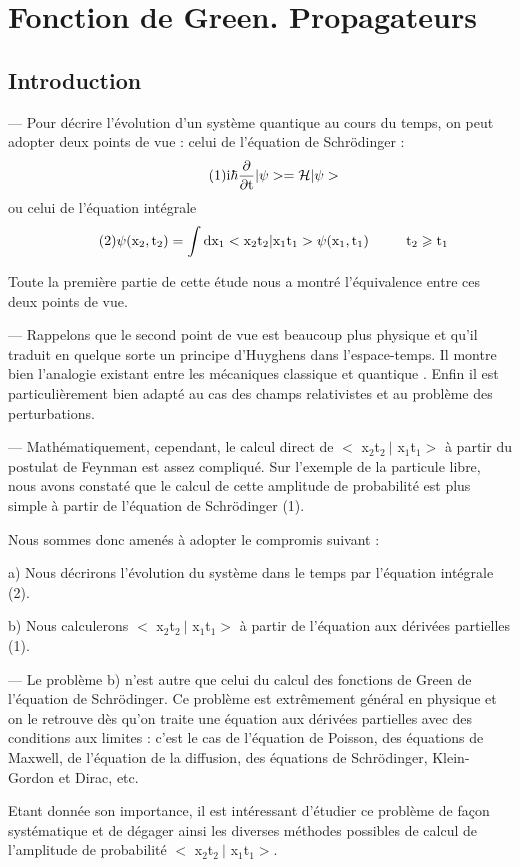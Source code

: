 \chapter{Fonction de Green. Propagateurs}
\section{Introduction}%
— Pour décrire l'évolution d'un système quantique au cours
du temps, on peut adopter deux points de vue : celui de l'équation de
Schrödinger :
\[
\tag{1}\text{i}\hbar\frac{\partial}{\partial\text{t}}|\psi>=\mathcal{H}|\psi>
\]
ou celui de l'équation intégrale
\[
\tag{2}\psi(\text{x}_2,\text{t}_2)=\int\text{dx}_1<\text{x}_2\text{t}_2|\text{x}_1\text{t}_1>\psi(\text{x}_1,\text{t}_1)
\ \ \ \ \ \ \ \ \text{t}_2\geqslant\text{t}_1
\]

Toute la première partie de cette étude nous a montré l'équivalence entre ces deux points de vue.

— Rappelons que le second point de vue est beaucoup plus physique
et qu'il traduit en quelque sorte un principe d'Huyghens dans l'espace-temps.
Il montre bien l'analogie existant entre les mécaniques classique et quantique . Enfin il est particulièrement bien adapté au cas des champs relativistes et au problème des perturbations.

— Mathématiquement, cependant, le calcul direct de $<$ x$_2$t$_2\ |$ x$_1$t$_1>$
à partir du postulat de Feynman est assez compliqué. Sur l'exemple de la
particule libre, nous avons constaté que le calcul de cette amplitude de
probabilité est plus simple à partir de l'équation de Schrödinger (1).

Nous sommes donc amenés à adopter le compromis suivant :

a) Nous décrirons l'évolution du système dans le temps par l'équation intégrale (2).

b) Nous calculerons $<$ x$_2$t$_2\ |$ x$_1$t$_1>$ à partir de l'équation aux dérivées partielles (1).

 
— Le problème b) n'est autre que celui du calcul des fonctions
de Green de l'équation de Schrödinger. Ce problème est extrêmement général
en physique et on le retrouve dès qu'on traite une équation aux dérivées
partielles avec des conditions aux limites : c'est le cas de l'équation
de Poisson, des équations de Maxwell, de l'équation de la diffusion, des
équations de Schrödinger, Klein-Gordon et Dirac, etc.

Etant donnée son importance, il est intéressant d'étudier ce
problème de façon systématique et de dégager ainsi les diverses méthodes
possibles de calcul de l'amplitude de probabilité $<$ x$_2$t$_2\ |$ x$_1$t$_1>$.
